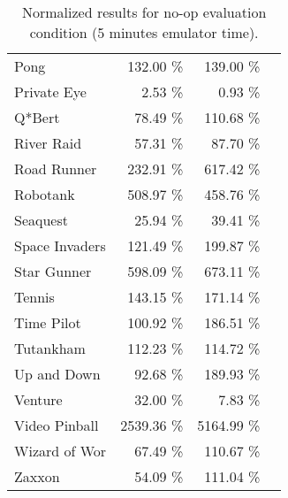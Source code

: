 \documentclass[letterpaper]{article}
\begin{document}
\begin{table*}[h]
\begin{tabular}{lrrr}
Pong & 132.00 \% & 139.00 \% \\
Private Eye & 2.53 \% & 0.93 \% \\
Q*Bert & 78.49 \% & 110.68 \% \\
River Raid & 57.31 \% & 87.70 \% \\
Road Runner & 232.91 \% & 617.42 \% \\
Robotank & 508.97 \% & 458.76 \% \\
Seaquest & 25.94 \% & 39.41 \% \\
Space Invaders & 121.49 \% & 199.87 \% \\
Star Gunner & 598.09 \% & 673.11 \% \\
Tennis & 143.15 \% & 171.14 \% \\
Time Pilot & 100.92 \% & 186.51 \% \\
Tutankham & 112.23 \% & 114.72 \% \\
Up and Down & 92.68 \% & 189.93 \% \\
Venture & 32.00 \% & 7.83 \% \\
Video Pinball & 2539.36 \% & 5164.99 \% \\
Wizard of Wor & 67.49 \% & 110.67 \% \\
Zaxxon & 54.09 \% & 111.04 \% \\
\end{tabular}
\caption{\label{table:at5_norm} Normalized results for no-op evaluation condition (5 minutes emulator time).}
\end{table*}
\end{document}
